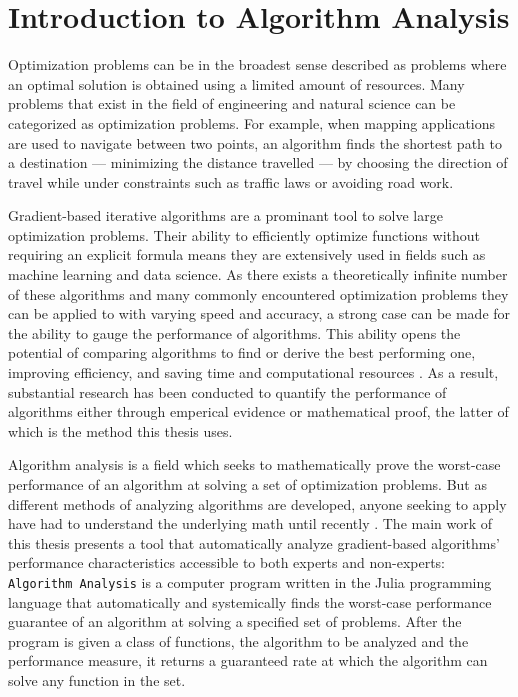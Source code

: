 \chapter{Introduction to Algorithm Analysis}

Optimization problems can be in the broadest sense described as problems where an optimal solution is obtained using a limited amount of resources. Many problems that exist in the field of engineering and natural science can be categorized as optimization problems. For example, when mapping applications are used to navigate between two points, an algorithm finds the shortest path to a destination --- minimizing the distance travelled --- by choosing the direction of travel while under constraints such as traffic laws or avoiding road work.

Gradient-based iterative algorithms are a prominant tool to solve large optimization problems. Their ability to efficiently optimize functions without requiring an explicit formula means they are extensively used in fields such as machine learning and data science. As there exists a theoretically infinite number of these algorithms and many commonly encountered optimization problems they can be applied to with varying speed and accuracy, a strong case can be made for the ability to gauge the performance of algorithms. This ability opens the potential of comparing algorithms to find or derive the best performing one, improving efficiency, and saving time and computational resources . As a result, substantial research has been conducted to quantify the performance of algorithms either through emperical evidence or mathematical proof, the latter of which is the method this thesis uses.

Algorithm analysis is a field which seeks to mathematically prove the worst-case performance of an algorithm at solving a set of optimization problems. But as different methods of analyzing algorithms are developed, anyone seeking to apply have had to understand the underlying math until recently \cite{pepit}. The main work of this thesis presents a tool that automatically analyze gradient-based algorithms' performance characteristics accessible to both experts and non-experts: \texttt{Algorithm Analysis} is a computer program written in the Julia programming language that automatically and systemically finds the worst-case performance guarantee of an algorithm at solving a specified set of problems. After the program is given a class of functions, the algorithm to be analyzed and the performance measure, it returns a guaranteed rate at which the algorithm can solve any function in the set.

